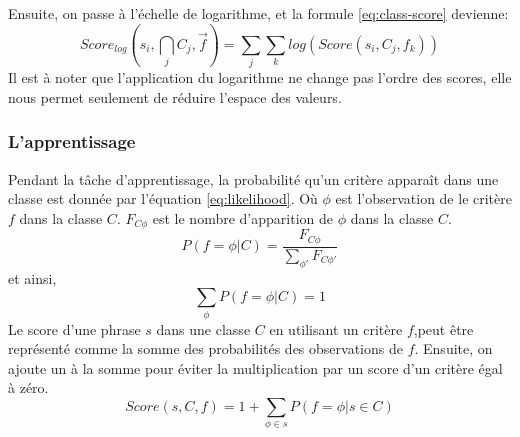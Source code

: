 \documentclass[a4paper,12pt,oneside]{../use/ESIthesis}
\begin{document}
Ensuite, on passe à l'échelle de logarithme, et la formule \ref{eq:class-score} devienne:
\begin{equation}
\label{eq:log-class-score}
Score_{log}(s_i , \bigcap_{j} C_j , \overrightarrow{f}) = 
\sum_{j} \sum_{k} log (Score(s_i , C_j , f_k ))
\end{equation}
Il est à noter que l'application du logarithme ne change pas l'ordre des scores, elle nous permet seulement de réduire l'espace des valeurs.

\subsubsection{L'apprentissage}

Pendant la tâche d'apprentissage, la probabilité qu'un critère apparaît dans une classe est donnée par l'équation \ref{eq:likelihood}.
Où $\phi$ est l'observation de le critère $ f $ dans la classe $ C $. 
$F_{C\phi}$ est le nombre d'apparition de $\phi$ dans la classe $ C $.
\begin{equation}
\label{eq:likelihood}
P(f = \phi | C) = \frac {F_{C\phi}}{\sum_{\phi'}{F_{C\phi'}}}
\end{equation}
et ainsi,
\begin{equation}
\label{eq:sum_likelihood}
\sum_{\phi} P(f = \phi | C) = 1
\end{equation}
Le score d'une phrase $ s $ dans une classe $ C $ en utilisant un critère $ f $,peut être représenté comme la somme des probabilités des observations de $ f $.
Ensuite, on ajoute un à la somme pour éviter la multiplication par un score d'un critère égal à zéro.
\begin{equation}
\label{eq:score}
Score(s , C , f ) = 1 + \sum_{\phi \in s} {P(f=\phi | s \in C)}
\end{equation}
\end{document}
